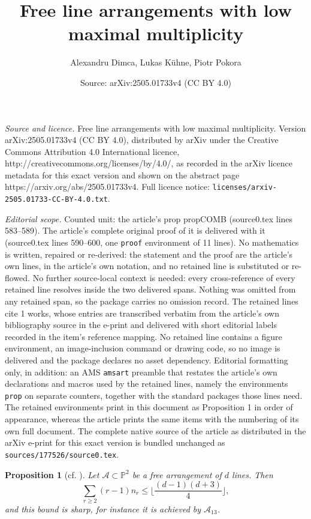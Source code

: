 \documentclass[10pt,a4paper]{amsart}
\title{Free line arrangements with low maximal multiplicity}
\author{Alexandru Dimca, Lukas K\"uhne, Piotr Pokora}
\date{Source: arXiv:2505.01733v4 (CC BY 4.0)}
\newtheorem{prop}{Proposition}
\newcommand{\A}{{\mathcal A}}
\begin{document}
\maketitle

\noindent\emph{Source and licence.} Free line arrangements with low maximal multiplicity. Version arXiv:2505.01733v4 (CC BY 4.0), distributed by arXiv under the Creative Commons Attribution 4.0 International licence, http://creativecommons.org/licenses/by/4.0/, as recorded in the arXiv licence metadata for this exact version and shown on the abstract page https://arxiv.org/abs/2505.01733v4. Full licence notice: \texttt{licenses/arxiv-2505.01733-CC-BY-4.0.txt}.\par\smallskip

\noindent\textit{Editorial scope.} Counted unit: the article's prop propCOMB (source0.tex lines 583--589). The article's complete original proof of it is delivered with it (source0.tex lines 590--600, one \texttt{proof} environment of 11 lines). No mathematics is written, repaired or re-derived: the statement and the proof are the article's own lines, in the article's own notation, and no retained line is substituted or re-flowed.  No further source-local context is needed: every cross-reference of every retained line resolves inside the two delivered spans.  Nothing was omitted from any retained span, so the package carries no omission record.  The retained lines cite 1 works, whose entries are transcribed verbatim from the article's own bibliography source in the e-print and delivered with short editorial labels recorded in the item's reference mapping.  No retained line contains a figure environment, an image-inclusion command or drawing code, so no image is delivered and the package declares no asset dependency.  Editorial formatting only, in addition: an AMS \texttt{amsart} preamble that restates the article's own declarations and macros used by the retained lines, namely the environments \texttt{prop} on separate counters, together with the standard packages those lines need.  The retained environments print in this document as Proposition 1 in order of appearance, whereas the article prints the same items with the numbering of its own full document.  The complete native source of the article as distributed in the arXiv e-print for this exact version is bundled unchanged as \texttt{sources/177526/source0.tex}.
\begin{prop}[cf. {\cite[Proposition 6.5]{Osaka}}]
\label{propCOMB}
Let $\A \subset \mathbb{P}^{2}$ be a free arrangement of $d$ lines. Then
$$\sum_{r\geq 2}(r-1)n_{r} \leq \bigg\lfloor \frac{(d-1)(d+3)}{4}\bigg\rfloor,$$
and this bound is sharp, for instance it is achieved by $\mathcal{A}_{13}$.

\end{prop}
\end{document}
